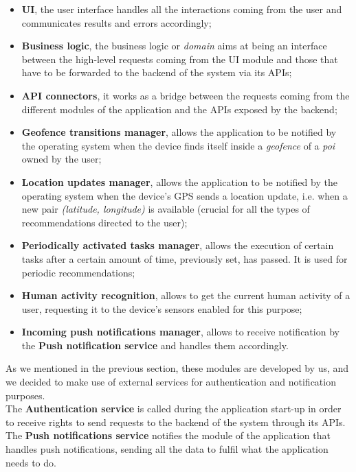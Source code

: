 \documentclass[../../main]{subfiles}
\begin{document}
\begin{itemize}
    \item \textbf{UI}, the user interface handles all the interactions coming from the user and communicates results and errors accordingly;
    \item \textbf{Business logic}, the business logic or \textit{domain} aims at being an interface between the high-level requests coming from the UI module and those that have to be forwarded to the backend of the system via its APIs;
    \item \textbf{API connectors}, it works as a bridge between the requests coming from the different modules of the application and the APIs exposed by the backend;
    \item \textbf{Geofence transitions manager}, allows the application to be notified by the operating system when the device finds itself inside a \textit{geofence} of a \textit{poi} owned by the user;
    \item \textbf{Location updates manager}, allows the application to be notified by the operating system when the device's GPS sends a location update, i.e. when a new pair \textit{(latitude, longitude)} is available (crucial for all the types of recommendations directed to the user);
    \item \textbf{Periodically activated tasks manager}, allows the execution of certain tasks after a certain amount of time, previously set, has passed. It is used for periodic recommendations;
    \item \textbf{Human activity recognition}, allows to get the current human activity of a user, requesting it to the device's sensors enabled for this purpose;
    \item \textbf{Incoming push notifications manager}, allows to receive notification by the \textbf{Push notification service} and handles them accordingly.
\end{itemize}
As we mentioned in the previous section, these modules are developed by us, and we decided to make use of external services for authentication and notification purposes.\\
The \textbf{Authentication service} is called during the application start-up in order to receive rights to send requests to the backend of the system through its APIs.
The \textbf{Push notifications service} notifies the module of the application that handles push notifications, sending all the data to fulfil what the application needs to do.
\end{document}
